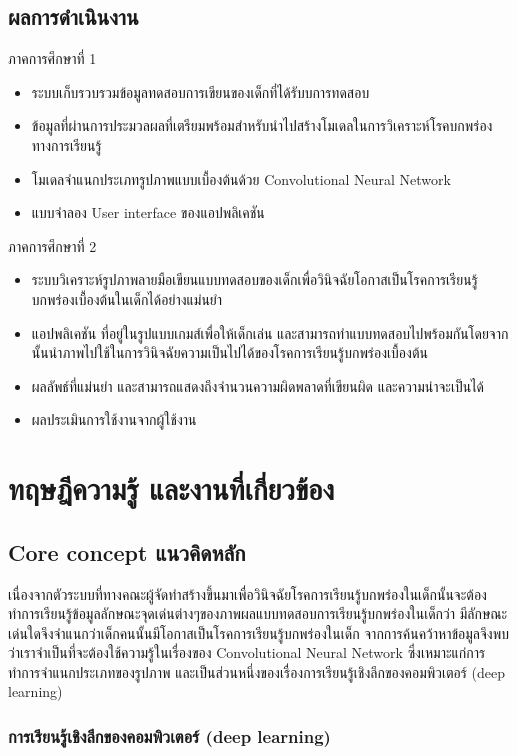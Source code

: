 \documentclass[12pt,oneside,openright,a4paper]{cpe-thai-project}
\begin{document}
\section{ผลการดำเนินงาน}
\noindent ภาคการศึกษาที่ 1 
\begin{itemize}
  \item ระบบเก็บรวบรวมข้อมูลทดสอบการเขียนของเด็กที่ได้รับบการทดสอบ
  \item ข้อมูลที่ผ่านการประมวลผลที่เตรียมพร้อมสำหรับนำไปสร้างโมเดลในการวิเคราะห์โรคบกพร่องทางการเรียนรู้
  \item โมเดลจำแนกประเภทรูปภาพแบบเบื้องต้นด้วย Convolutional Neural Network
  \item แบบจำลอง User interface ของแอปพลิเคชัน
\end{itemize}
ภาคการศึกษาที่ 2 
\begin{itemize}
  \item ระบบวิเคราะห์รูปภาพลายมือเขียนแบบทดสอบของเด็กเพื่อวินิจฉัยโอกาสเป็นโรคการเรียนรู้บกพร่องเบื้องต้นในเด็กได้อย่างแม่นยำ
  \item แอปพลิเคชัน ที่อยู่ในรูปแบบเกมส์เพื่อให้เด็กเล่น และสามารถทำแบบทดสอบไปพร้อมกันโดยจากนั้นนำภาพไปใช้ในการวินิจฉัยความเป็นไปได้ของโรคการเรียนรู้บกพร่องเบื้องต้น
  \item ผลลัพธ์ที่แม่นยำ และสามารถแสดงถึงจำนวนความผิดพลาดที่เขียนผิด และความน่าจะเป็นได้
  \item ผลประเมินการใช้งานจากผู้ใช้งาน
\end{itemize}
\chapter{ทฤษฎีความรู้ และงานที่เกี่ยวข้อง}
\section{Core concept แนวคิดหลัก}
เนื่องจากตัวระบบที่ทางคณะผู้จัดทำสร้างขึ้นมาเพื่อวินิจฉัยโรคการเรียนรู้บกพร่องในเด็กนั้นจะต้องทำการเรียนรู้ข้อมูลลักษณะจุดเด่นต่างๆของภาพผลแบบทดสอบการเรียนรู้บกพร่องในเด็กว่า 
มีลักษณะเด่นใดจึงจำแนกว่าเด็กคนนั้นมีโอกาสเป็นโรคการเรียนรู้บกพร่องในเด็ก 
จากการค้นคว้าหาข้อมูลจึงพบว่าเราจำเป็นที่จะต้องใช้ความรู้ในเรื่องของ Convolutional Neural Network 
ซึ่งเหมาะแก่การทำการจำแนกประเภทของรูปภาพ และเป็นส่วนหนึ่งของเรื่องการเรียนรู้เชิงลึกของคอมพิวเตอร์ (deep learning)

\subsection{การเรียนรู้เชิงลึกของคอมพิวเตอร์ (deep learning)}
\end{document}

